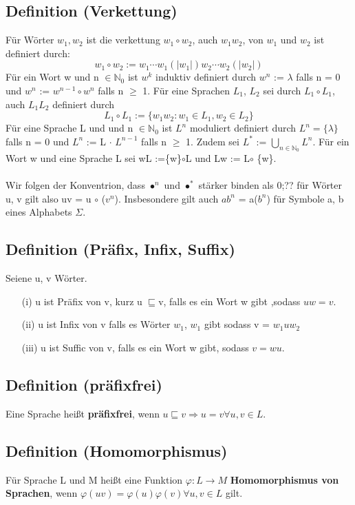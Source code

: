 \documentclass[a4paper,11pt]{article}
\begin{document}
\subsection{Definition (Verkettung)}
Für Wörter $w_{1}, w_{2}$ ist die verkettung  $w_{1} \circ w_{2}$, auch $w_{1}w_{2}$, von $w_{1}$ und $w_{2}$ ist definiert durch:
\[w_{1} \circ w_{2} := w_{1} \cdots w_{1} (\lvert w_{1} \rvert)w_{2} \cdots w_{2} (\lvert w_{2} \rvert)\]
Für ein Wort w und n $\in \mathbb{N}_{0}$ ist $w^{k}$ induktiv definiert durch $w^{n}$ := $\lambda$ falls n = 0 und $w^{n}$ := $w^{n-1} \circ w^{n}$ falls n $\geq $ 1. Für eine Sprachen $L_{1}$, $L_{2}$ sei durch $L_{1} \circ L_{1}$, auch $L_{1}L_{2}$ definiert durch
\[L_{1} \circ L_{1} := \{w_{1}w_{2} : w_{1} \in L_{1}, w_{2} \in L_{2}\}\]
Für eine Sprache L und und n $\in\mathbb{N}_{0}$ ist $L^{n}$ moduliert definiert durch $L^{n} = \{\lambda\}$ falls n = 0 und $L^{n}$ := L $\cdot$ $L^{n - 1}$ falls n $\geq$ 1. Zudem sei $L^{*}$ := $\bigcup \limits_{n \in \mathbb{N}_{0}}L^{n}$. Für ein Wort w und eine Sprache L sei wL :=\{w\}$\circ$L und Lw := L$\circ$ \{w\}.\\\\Wir folgen der Konventrion, dass $\bullet^{n}$ und $\bullet^{*}$ stärker binden als 0;?? für Wörter u, v gilt also uv = u $\circ$ ($v^{n}$). Insbesondere gilt auch $ab^{n}$ = a($b^{n}$) für Symbole a, b eines Alphabets $\Sigma$.

\subsection{Definition (Präfix, Infix, Suffix)}
Seiene u, v Wörter.
\begin{itemize}
    \item [(i)] u ist Präfix von v, kurz u $\sqsubseteq $v, falls es ein Wort w gibt ,sodass $uw = v$.
    \item [(ii)] u ist Infix von v falls es Wörter $w_{1}$, $w_{1}$ gibt sodass v = $w_{1} u w_{2}$
    \item [(iii)] u ist Suffic von v, falls es ein Wort w gibt, sodass $v = wu$.
\end{itemize}

\subsection{Definition (präfixfrei)}
Eine Sprache heißt \textbf{präfixfrei}, wenn $u\sqsubseteq v \Rightarrow u = v \forall u,v \in L$.

\subsection{Definition (Homomorphismus)}
Für Sprache L und M heißt eine Funktion $\varphi : L \rightarrow M$ \textbf{Homomorphismus von Sprachen}, wenn $\varphi(uv) = \varphi (u) \varphi (v) \forall u, v \in L$ gilt.
\end{document}
